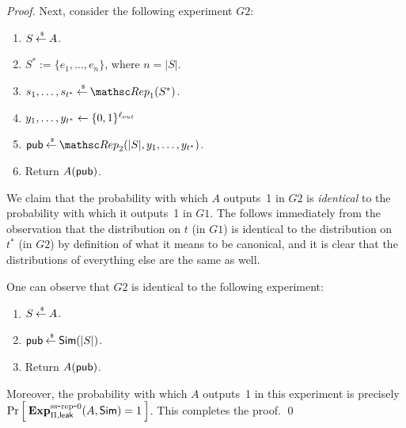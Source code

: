 \begin{proof}
Next, consider the following experiment $G2$:
\begin{enumerate}
\item $S {\:\stackrel{{\scriptscriptstyle \hspace{0.2em}\$}} {\leftarrow}\:} A$.
\item $S^* := \{e_1, \ldots, e_n\}$, where $n = |S|$.
\item $s_1, \ldots, s_{t^*} \getsr \Rep_1(S^*)$.
\item $y_1, \ldots, y_{t^*} \leftarrow \{0,1\}^{\ell_{out}}$
\item $\pubaux \getsr \Rep_2(|S|, y_1, \ldots, y_{t^*})$.
\item Return $A({\sf pub})$.
\end{enumerate}
We claim that the probability with which $A$ outputs~1 in $G2$ is \emph{identical} to the
probability with which it outputs~1 in $G1$.
The follows immediately from the
observation that the distribution on $t$ (in $G1$) is identical to the distribution on~$t^*$
(in $G2$) by definition
of what it means to be canonical, and it is clear that the distributions of everything
else are the same as well.

One can observe that $G2$ is identical to the following experiment:
\begin{enumerate}
\item $S {\:\stackrel{{\scriptscriptstyle \hspace{0.2em}\$}} {\leftarrow}\:} A$.
\item ${\sf pub} {\:\stackrel{{\scriptscriptstyle \hspace{0.2em}\$}} {\leftarrow}\:} {\sf Sim}(|S|)$.
\item Return $A({\sf pub})$.
\end{enumerate}
Moreover, the probability with which $A$ outputs~1 in this experiment is
precisely $\Pr\left[\: \mathrm{\mathbf{Exp}}^{\mathrm{ss\mbox{-}rep\mbox{-}0}}_{\Pi,{\sf leak}}(A, {\sf Sim})=1 \:\right]$.
This completes the proof. \hfill\qed
\end{proof}

